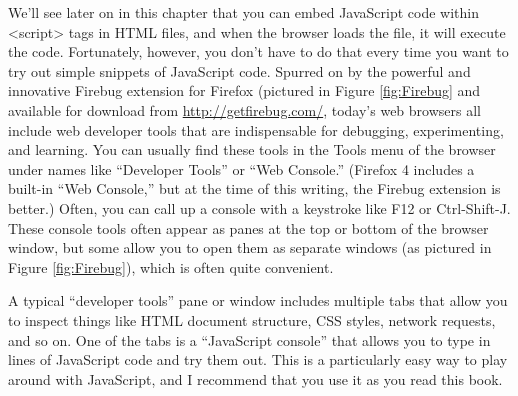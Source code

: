 We’ll see later on in this chapter that you can embed JavaScript code within <script>
tags in HTML files, and when the browser loads the file, it will execute the code. Fortunately,
however, you don’t have to do that every time you want to try out simple
snippets of JavaScript code. Spurred on by the powerful and innovative Firebug extension
for Firefox (pictured in Figure \ref{fig:Firebug} and available for download from \href{http://getfirebug.com/}{http://getfirebug.com/}, today’s web browsers all include web developer tools that are indispensable for
debugging, experimenting, and learning. You can usually find these tools in the Tools
menu of the browser under names like “Developer Tools” or “Web Console.”
(Firefox 4 includes a built-in “Web Console,” but at the time of this writing, the Firebug
extension is better.) Often, you can call up a console with a keystroke like F12 or Ctrl-Shift-J.
These console tools often appear as panes at the top or bottom of the browser
window, but some allow you to open them as separate windows (as pictured in Figure
\ref{fig:Firebug}), which is often quite convenient.\cite{20}


A typical “developer tools” pane or window includes multiple tabs that allow you to
inspect things like HTML document structure, CSS styles, network requests, and so
on. One of the tabs is a “JavaScript console” that allows you to type in lines of JavaScript
code and try them out. This is a particularly easy way to play around with JavaScript,
and I recommend that you use it as you read this book.

